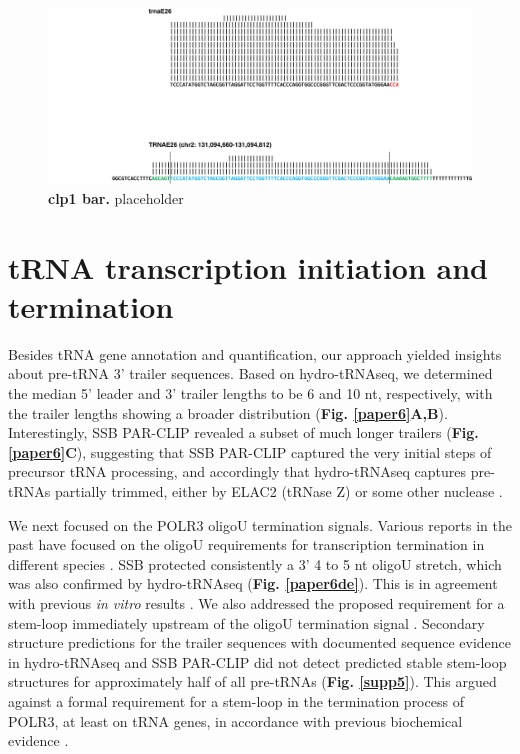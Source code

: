 \documentclass[12pt]{rockefeller}
\begin{document}
\begin{figure}[!ht]%
\centering
\includegraphics[width=\textwidth]{hierarchical_mapping.png}%
\caption[clp1 bar]
{\textbf{clp1 bar.}
placeholder}
\centering
\label{hierarchical}%
\end{figure}


\section{tRNA transcription initiation and termination}

Besides tRNA gene annotation and quantification, our approach yielded insights about pre-tRNA 3’ trailer sequences. Based on hydro-tRNAseq, we determined the median 5’ leader and 3’ trailer lengths to be 6 and 10 nt, respectively, with the trailer lengths showing a broader distribution (\textbf{Fig. \ref{paper6}A,B}). Interestingly, SSB PAR-CLIP revealed a subset of much longer trailers (\textbf{Fig. \ref{paper6}C}), suggesting that SSB PAR-CLIP captured the very initial steps of precursor tRNA processing, and accordingly that hydro-tRNAseq captures pre-tRNAs partially trimmed, either by ELAC2 (tRNase Z) or some other nuclease \cite{Phizicky:2010jf}.

We next focused on the POLR3 oligoU termination signals. Various reports in the past have focused on the oligoU requirements for transcription termination in different species \cite{Arimbasseri:2014hj,Nielsen:2013be}. SSB protected consistently a 3’ 4 to 5 nt oligoU stretch, which was also confirmed by hydro-tRNAseq (\textbf{Fig. \ref{paper6de}}). This is in agreement with previous \textit{in vitro} results \cite{Bayfield:2009cx,Stefano:1984wp,Teplova:2006dv}. We also addressed the proposed requirement for a stem-loop immediately upstream of the oligoU termination signal \cite{Nielsen:2013be}. Secondary structure predictions for the trailer sequences with documented sequence evidence in hydro-tRNAseq and SSB PAR-CLIP did not detect predicted stable stem-loop structures for approximately half of all pre-tRNAs (\textbf{Fig. \ref{supp5}}). This argued against a formal requirement for a stem-loop in the termination process of POLR3, at least on tRNA genes, in accordance with previous biochemical evidence \cite{Arimbasseri:2014hj}.
\end{document}

